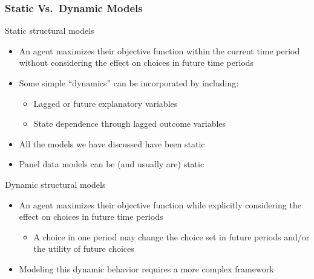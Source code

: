 \documentclass{beamer}
\begin{document}
\begin{frame}\frametitle{Static Vs.\ Dynamic Models}
    Static structural models
    \begin{itemize}
    	\item An agent maximizes their objective function within the current time period without considering the effect on choices in future time periods
    	\item Some simple ``dynamics'' can be incorporated by including:
    	\begin{itemize}
    		\item Lagged or future explanatory variables
    		\item State dependence through lagged outcome variables
    	\end{itemize}
    	\item All the models we have discussed have been static
    	\item Panel data models can be (and usually are) static
    \end{itemize}
    \vspace{3ex}
    Dynamic structural models
    \begin{itemize}
    	\item An agent maximizes their objective function while explicitly considering the effect on choices in future time periods
    	\begin{itemize}
    		\item A choice in one period may change the choice set in future periods and/or the utility of future choices
    	\end{itemize}
    	\item Modeling this dynamic behavior requires a more complex framework
    \end{itemize}
\end{frame}
\end{document}
